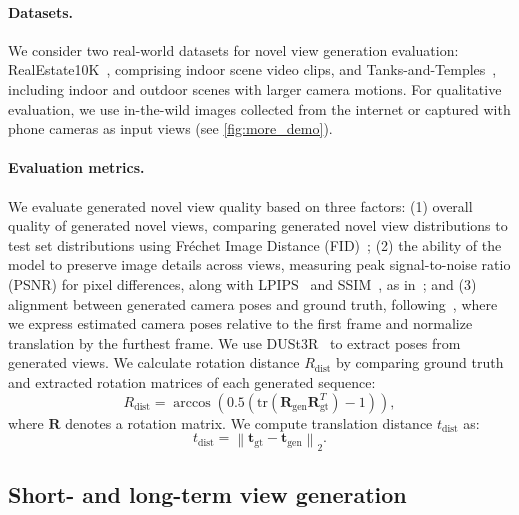 \paragraph{Datasets.}%
\label{sec:datasets}
We consider two real-world datasets for novel view generation evaluation: RealEstate10K~\cite{realestate}, comprising indoor scene video clips, and Tanks-and-Temples~\cite{knapitsch2017tanks}, including indoor and outdoor scenes with larger camera motions.
For qualitative evaluation, we use in-the-wild images collected from the internet or captured with phone cameras as input views (see \cref{fig:more_demo}).

\paragraph{Evaluation metrics.}%
\label{sec:metrics}
We evaluate generated novel view quality based on three factors:
(1) overall quality of generated novel views, comparing generated novel view distributions to test set distributions using Fréchet Image Distance (FID)~\cite{fid};
(2) the ability of the model to preserve image details across views, measuring peak signal-to-noise ratio (PSNR) for pixel differences, along with LPIPS~\cite{lpips} and SSIM~\cite{ssim}, as in~\cite{ren2022look}; and
(3) alignment between generated camera poses and ground truth, following~\cite{he2024cameractrl}, where we express estimated camera poses relative to the first frame and normalize translation by the furthest frame.
We use DUSt3R~\cite{dust3r_cvpr24} to extract poses from generated views.
We calculate rotation distance $R_{\text{dist}}$ by comparing ground truth and extracted rotation matrices of each generated sequence:
\[
R_{\text{dist}} = \arccos\left(0.5\left(\text{tr}(\mathbf{R}_{\text{gen}} \mathbf{R}^{T}_{\text{gt}}) - 1\right)\right),
\]
where $\mathbf{R}$ denotes a rotation matrix.
We compute translation distance $t_{\text{dist}}$ as:
\[
t_{\text{dist}} = \left \| \mathbf{t}_{\text{gt}} - \mathbf{t}_{\text{gen}} \right \|_2.
\]



\subsection{Short- and long-term view generation}%
\label{exp:short-term}

